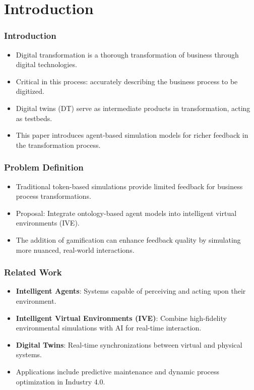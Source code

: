 \section{Introduction}

\begin{frame}
    \frametitle{Introduction}
    \begin{itemize}
        \item Digital transformation is a thorough transformation of business through digital technologies.
        \item Critical in this process: accurately describing the business process to be digitized.
        \item Digital twins (DT) serve as intermediate products in transformation, acting as testbeds.
        \item This paper introduces agent-based simulation models for richer feedback in the transformation process.
    \end{itemize}
\end{frame}

\begin{frame}
    \frametitle{Problem Definition}
    \begin{itemize}
        \item Traditional token-based simulations provide limited feedback for business process transformations.
        \item Proposal: Integrate ontology-based agent models into intelligent virtual environments (IVE).
        \item The addition of gamification can enhance feedback quality by simulating more nuanced, real-world interactions.
    \end{itemize}
\end{frame}

\begin{frame}
    \frametitle{Related Work}
    \begin{itemize}
        \item \textbf{Intelligent Agents}: Systems capable of perceiving and acting upon their environment.
        \item \textbf{Intelligent Virtual Environments (IVE)}: Combine high-fidelity environmental simulations with AI for real-time interaction.
        \item \textbf{Digital Twins}: Real-time synchronizations between virtual and physical systems.
        \item Applications include predictive maintenance and dynamic process optimization in Industry 4.0.
    \end{itemize}
\end{frame}

